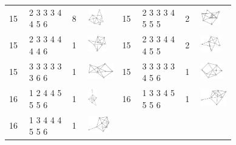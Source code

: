 \begin{footnotesize}
\begin{longtable}{
        m{0.05\linewidth} m{0.15\linewidth} m{0.05\linewidth} m{0.12\linewidth} |
        m{0.05\linewidth} m{0.15\linewidth} m{0.05\linewidth} m{0.12\linewidth}
    }
15 & 2 3 3 3 4 4 5 6 & 8 & \includegraphics[height=0.7151cm]{15-universal-graphs/img/degree-sequences-example-graphs/graph-4-8-124} &
15 & 2 3 3 3 4 5 5 5 & 2 & \includegraphics[height=0.7151cm]{15-universal-graphs/img/degree-sequences-example-graphs/graph-4-8-125}\\
15 & 2 3 3 4 4 4 4 6 & 1 & \includegraphics[height=0.7151cm]{15-universal-graphs/img/degree-sequences-example-graphs/graph-4-8-126} &
15 & 2 3 3 4 4 4 5 5 & 2 & \includegraphics[height=0.7151cm]{15-universal-graphs/img/degree-sequences-example-graphs/graph-4-8-127}\\
15 & 3 3 3 3 3 3 6 6 & 1 & \includegraphics[height=0.7151cm]{15-universal-graphs/img/degree-sequences-example-graphs/graph-4-8-128} &
15 & 3 3 3 3 3 4 5 6 & 1 & \includegraphics[height=0.7151cm]{15-universal-graphs/img/degree-sequences-example-graphs/graph-4-8-129}\\
16 & 1 2 4 4 5 5 5 6 & 1 & \includegraphics[height=0.7151cm]{15-universal-graphs/img/degree-sequences-example-graphs/graph-4-8-130} &
16 & 1 3 3 4 5 5 5 6 & 1 & \includegraphics[height=0.7151cm]{15-universal-graphs/img/degree-sequences-example-graphs/graph-4-8-131}\\
16 & 1 3 4 4 4 5 5 6 & 1 & \includegraphics[height=0.7151cm]{15-universal-graphs/img/degree-sequences-example-graphs/graph-4-8-132} &

\end{longtable}
\end{footnotesize}

